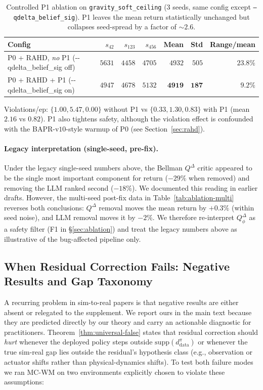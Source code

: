 \documentclass{article}
\theoremstyle{definition}
\newcommand{\supp}{\mathrm{supp}}
\newcommand{\dpi}{d^{\pi}}
\newcommand{\QD}{Q^{\Delta}}
\begin{document}
\begin{table}[h]
\caption{Controlled P1 ablation on \texttt{gravity\_soft\_ceiling}
(3 seeds, same config except \texttt{--qdelta\_belief\_sig}).
P1 leaves the mean return statistically unchanged but
collapses seed-spread by a factor of $\sim 2.6$.}
\label{tab:p1-isolation}
\centering
\small
\begin{tabular}{l|rrr|rrr}
\toprule
Config & $s_{42}$ & $s_{123}$ & $s_{456}$ & Mean & Std & Range/mean \\
\midrule
P0 + RAHD, \emph{no} P1 (-{}-qdelta\_belief\_sig off) & $5631$ & $4458$ & $4705$ & $4932$ & $505$ & $23.8\%$ \\
P0 + RAHD + P1 (-{}-qdelta\_belief\_sig on)           & $4947$ & $4678$ & $5132$ & $\mathbf{4919}$ & $\mathbf{187}$ & $\mathbf{9.2\%}$ \\
\bottomrule
\end{tabular}
\par\smallskip
\footnotesize
Violations/ep: $\{1.00,5.47,0.00\}$ without P1 vs $\{0.33,1.30,0.83\}$
with P1 (mean $2.16$ vs $0.82$).  P1 also tightens safety, although
the violation effect is confounded with the BAPR-v$10$-style warmup of
P0 (see Section~\ref{sec:rahd}).
\end{table}

\paragraph{Legacy interpretation (single-seed, pre-fix).}
Under the legacy single-seed numbers above, the Bellman $\QD$ critic
appeared to be the single most important component for return
($-29\%$ when removed) and removing the LLM ranked second ($-18\%$).
We documented this reading in earlier drafts.  However, the multi-seed
post-fix data in Table~\ref{tab:ablation-multi} reverses both
conclusions: $\QD$ removal moves the mean return by $+0.3\%$ (within
seed noise), and LLM removal moves it by $-2\%$.  We therefore
re-interpret $\QD_\phi$ as a safety filter (F1 in §\ref{sec:ablation})
and treat the legacy numbers above as illustrative of the bug-affected
pipeline only.

\subsection{When Residual Correction Fails: Negative Results and Gap Taxonomy}
\label{sec:taxonomy}

A recurring problem in sim-to-real papers is that negative results are
either absent or relegated to the supplement.  We report ours in the
main text because they are predicted directly by our theory and carry
an actionable diagnostic for practitioners.
Theorem~\ref{thm:universal-false} states that residual correction
should \emph{hurt} whenever the deployed policy steps outside
$\supp(\dpi_{\mathrm{data}})$ or whenever the true sim-real gap lies
outside the residual's hypothesis class (e.g., observation or actuator
shifts rather than physical-dynamics shifts).  To test both failure
modes we ran MC-WM on two environments explicitly chosen to violate
these assumptions:
\end{document}
